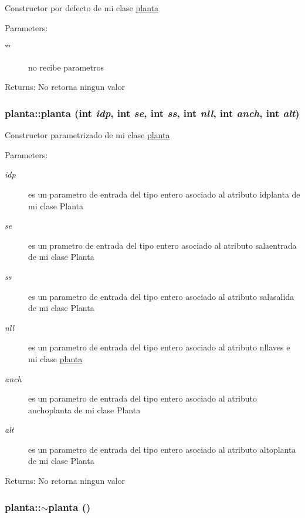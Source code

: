 Constructor por defecto de mi clase \hyperlink{classplanta}{planta} \begin{Desc}
\item[Parameters:]
\begin{description}
\item[{\em \char`\"{}\char`\"{}}]no recibe parametros \end{description}
\end{Desc}
\begin{Desc}
\item[Returns:]No retorna ningun valor \end{Desc}
\hypertarget{classplanta_e6a56480cf07955e354043f1221177fe}{
\subsubsection[planta]{\setlength{\rightskip}{0pt plus 5cm}planta::planta (int {\em idp}, \/  int {\em se}, \/  int {\em ss}, \/  int {\em nll}, \/  int {\em anch}, \/  int {\em alt})}}
\label{classplanta_e6a56480cf07955e354043f1221177fe}


Constructor parametrizado de mi clase \hyperlink{classplanta}{planta} \begin{Desc}
\item[Parameters:]
\begin{description}
\item[{\em idp}]es un parametro de entrada del tipo entero asociado al atributo idplanta de mi clase Planta \item[{\em se}]es un prametro de entrada del tipo entero asociado al atributo salaentrada de mi clase Planta \item[{\em ss}]es un parametro de entrada del tipo entero asociado al atributo salasalida de mi clase Planta \item[{\em nll}]es un parametro de entrada del tipo entero asociado al atributo nllaves e mi clase \hyperlink{classplanta}{planta} \item[{\em anch}]es un parametro de entrada del tipo entero asociado al atributo anchoplanta de mi clase Planta \item[{\em alt}]es un parametro de entrada del tipo entero asociado al atributo altoplanta de mi clase Planta \end{description}
\end{Desc}
\begin{Desc}
\item[Returns:]No retorna ningun valor \end{Desc}
\hypertarget{classplanta_a86392313eeb2f2c217454abf0c7e216}{
\subsubsection[$\sim$planta]{\setlength{\rightskip}{0pt plus 5cm}planta::$\sim$planta ()}}
\label{classplanta_a86392313eeb2f2c217454abf0c7e216}


